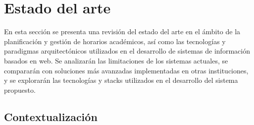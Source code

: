 \chapter{Estado del arte}\label{cap:estado}


En esta sección se presenta una revisión del estado del arte en el ámbito de la planificación y gestión de horarios académicos, así como las tecnologías y paradigmas arquitectónicos utilizados en el desarrollo de sistemas de información basados en web. Se analizarán las limitaciones de los sistemas actuales, se compararán con soluciones más avanzadas implementadas en otras instituciones, y se explorarán las tecnologías y stacks utilizados en el desarrollo del sistema propuesto.

\section{Contextualización}

